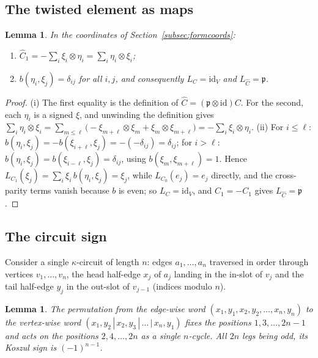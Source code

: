 \documentclass[11pt]{article}
\newtheorem{lemm}[theo]{Lemma}
\newcommand{\parityop}{\mathfrak{p}}              %
\newcommand{\copair}{C}                           %
\newcommand{\twistedC}{\widehat{C}}               %
\begin{document}
\subsection{The twisted element as maps}\label{subsec:twistedmaps}

\begin{lemm}\label{lemm:twistedmaps}
In the coordinates of Section~\ref{subsec:formcoords}:
\begin{enumerate}
\item[(i)] $\twistedC_{1}
  =-\sum_{i}\xi_{i}\otimes\eta_{i}
  =\sum_{i}\eta_{i}\otimes\xi_{i}$;
\item[(ii)] $b(\eta_{i},\xi_{j})=\delta_{ij}$ for all $i,j$, and
  consequently $L_{\copair}=\mathrm{id}_{V}$ and
  $L_{\twistedC}=\parityop$.
\end{enumerate}
\end{lemm}

\begin{proof}
(i) The first equality is the definition of
$\twistedC=(\parityop\otimes\mathrm{id})\copair$. For the second,
each $\eta_{i}$ is a signed $\xi$, and unwinding the definition
gives
$\sum_{i}\eta_{i}\otimes\xi_{i}
=\sum_{m\le\ell}\bigl(-\xi_{m+\ell}\otimes\xi_{m}
+\xi_{m}\otimes\xi_{m+\ell}\bigr)
=-\sum_{i}\xi_{i}\otimes\eta_{i}$.
(ii) For $i\le\ell$:
$b(\eta_{i},\xi_{j})=-b(\xi_{i+\ell},\xi_{j})
=-(-\delta_{ij})=\delta_{ij}$; for $i>\ell$:
$b(\eta_{i},\xi_{j})=b(\xi_{i-\ell},\xi_{j})=\delta_{ij}$, using
$b(\xi_{m},\xi_{m+\ell})=1$. Hence
$L_{\copair_{1}}(\xi_{j})=\sum_{i}\xi_{i}\,b(\eta_{i},\xi_{j})
=\xi_{j}$, while
$L_{\copair_{0}}(e_{j})=e_{j}$ directly, and the cross-parity
terms vanish because $b$ is even; so
$L_{\copair}=\mathrm{id}_{V}$, and
$\twistedC_{1}=-\copair_{1}$ gives $L_{\twistedC}=\parityop$.
\end{proof}

\subsection{The circuit sign}\label{subsec:circuitproof}

Consider a single $\kappa$-circuit of length $n$: edges
$a_{1},\dotsc,a_{n}$ traversed in order through
vertices $v_{1},\dotsc,v_{n}$, the head half-edge $x_{j}$ of
$a_{j}$ landing in the in-slot of $v_{j}$ and the tail half-edge
$y_{j}$ in the out-slot of $v_{j-1}$ (indices modulo $n$).

\begin{lemm}\label{lemm:cyclicparity}
The permutation from the edge-wise word
$(x_{1},y_{1},x_{2},y_{2},\dotsc,x_{n},y_{n})$ to the vertex-wise
word $(x_{1},y_{2}\,|\,x_{2},y_{3}\,|\,\dotsc\,|\,x_{n},y_{1})$
fixes the positions $1,3,\dotsc,2n-1$ and acts on the positions
$2,4,\dotsc,2n$ as a
single $n$-cycle. All $2n$ legs being odd, its Koszul sign is
$(-1)^{n-1}$.
\end{lemm}
\end{document}

